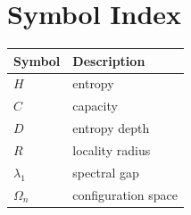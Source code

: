 \chapter{Symbol Index}

\begin{tabular}{ll}
Symbol & Description \\
\midrule
\(H\) & entropy \\
\(C\) & capacity \\
\(D\) & entropy depth \\
\(R\) & locality radius \\
\(\lambda_1\) & spectral gap \\
\(\Omega_n\) & configuration space \\
\end{tabular}

